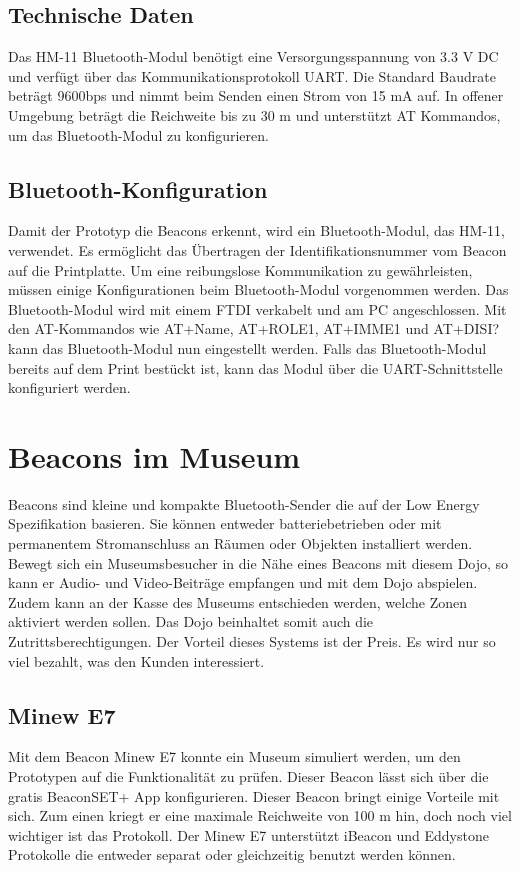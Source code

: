 \subsection{Technische Daten}
Das HM-11 Bluetooth-Modul benötigt eine Versorgungsspannung von 3.3 V DC und verfügt über das Kommunikationsprotokoll UART. Die Standard Baudrate beträgt 9600bps und nimmt beim Senden einen Strom von 15 mA auf. In offener Umgebung beträgt die Reichweite bis zu 30 m und unterstützt AT Kommandos, um das Bluetooth-Modul zu konfigurieren. 

\subsection{Bluetooth-Konfiguration}
Damit der Prototyp die Beacons erkennt, wird ein Bluetooth-Modul, das HM-11, verwendet. Es ermöglicht das Übertragen der Identifikationsnummer vom Beacon auf die Printplatte. Um eine reibungslose Kommunikation zu gewährleisten, müssen einige Konfigurationen beim Bluetooth-Modul vorgenommen werden. Das Bluetooth-Modul wird mit einem FTDI verkabelt und am PC angeschlossen. Mit den AT-Kommandos wie AT+Name, AT+ROLE1, AT+IMME1 und AT+DISI? kann das Bluetooth-Modul nun eingestellt werden. Falls das Bluetooth-Modul bereits auf dem Print bestückt ist, kann das Modul über die UART-Schnittstelle konfiguriert werden. 

\section{Beacons im Museum}
Beacons sind kleine und kompakte Bluetooth-Sender die auf der Low Energy Spezifikation basieren. Sie können entweder batteriebetrieben oder mit permanentem Stromanschluss an Räumen oder Objekten installiert werden. Bewegt sich ein Museumsbesucher in die Nähe eines Beacons mit diesem Dojo, so kann er Audio- und Video-Beiträge empfangen und mit dem Dojo abspielen. Zudem kann an der Kasse des Museums entschieden werden, welche Zonen aktiviert werden sollen. Das Dojo beinhaltet somit auch die Zutrittsberechtigungen. Der Vorteil dieses Systems ist der Preis. Es wird nur so viel bezahlt, was den Kunden  interessiert. 

\subsection{Minew E7}
Mit dem Beacon Minew E7 konnte ein Museum simuliert werden, um den Prototypen auf die Funktionalität zu prüfen. Dieser Beacon lässt sich über die gratis BeaconSET+ App konfigurieren. Dieser Beacon bringt einige Vorteile mit sich. Zum einen kriegt er eine maximale Reichweite von 100 m  hin, doch noch viel wichtiger ist das Protokoll. Der Minew E7 unterstützt iBeacon und Eddystone Protokolle die entweder separat oder gleichzeitig benutzt werden können. 

